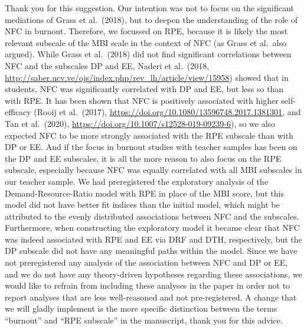 \documentclass[draft]{article}
\begin{document}
Thank you for this suggestion.
Our intention was not to focus on the significant mediations of Grass et al.~(2018), but to deepen the understanding of the role of NFC in burnout.
Therefore, we focussed on RPE, because it is likely the most relevant subscale of the MBI scale in the context of NFC (as Grass et al.~also argued).
While Grass et al.~(2018) did not find significant correlations between NFC and the subscales DP and EE, Naderi et al.~(2018, \url{http://saber.ucv.ve/ojs/index.php/rev_lh/article/view/15958}) showed that in students, NFC was significantly correlated with DP and EE, but less so than with RPE.
It has been shown that NFC is positively associated with higher self-efficacy (Rooij et al.~(2017), \url{https://doi.org/10.1080/13596748.2017.1381301}, and Tan et al.~(2020), \url{https://doi.org/10.1007/s12528-019-09239-6}), so we also expected NFC to be more strongly associated with the RPE subscale than with DP or EE.
And if the focus in burnout studies with teacher samples has been on the DP and EE subscales, it is all the more reason to also focus on the RPE subscale, especially because NFC was equally correlated with all MBI subscales in our teacher sample.
We had preregistered the exploratory analysis of the Demand-Resource-Ratio model with RPE in place of the MBI score, but this model did not have better fit indices than the initial model, which might be attributed to the evenly distributed associations between NFC and the subscales.
Furthermore, when constructing the exploratory model it became clear that NFC was indeed associated with RPE and EE via DRF and DTH, respectively, but the DP subscale did not have any meaningful paths within the model.
Since we have not preregistered any analysis of the association between NFC and DP or EE, and we do not have any theory-driven hypotheses regarding these associations, we would like to refrain from including these analyses in the paper in order not to report analyses that are less well-reasoned and not pre-registered.
A change that we will gladly implement is the more specific distinction between the terms ``burnout'' and ``RPE subscale'' in the manuscript, thank you for this advice.

\end{document}
